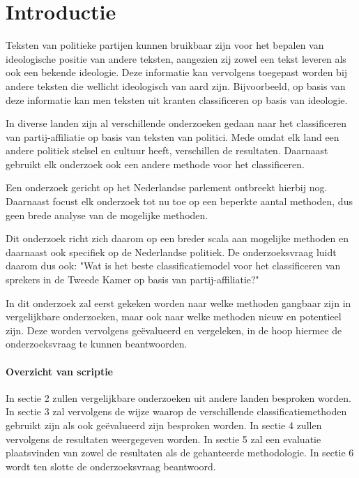 \section{Introductie}
\label{sec:intro}
Teksten van politieke partijen kunnen bruikbaar zijn voor het bepalen van ideologische positie van andere teksten, aangezien zij zowel een tekst leveren als ook een bekende ideologie. Deze informatie kan vervolgens toegepast worden bij andere teksten die wellicht ideologisch van aard zijn. Bijvoorbeeld, op basis van deze informatie kan men teksten uit kranten classificeren op basis van ideologie.\par
In diverse landen zijn al verschillende onderzoeken gedaan naar het classificeren van partij-affiliatie op basis van teksten van politici.\cite{Ferreira2016UsingTT} Mede omdat elk land een andere politiek stelsel en cultuur heeft, verschillen de resultaten. Daarnaast gebruikt elk onderzoek ook een andere methode voor het classificeren. \par
Een onderzoek gericht op het Nederlandse parlement ontbreekt hierbij nog. Daarnaast focust elk onderzoek tot nu toe op een beperkte aantal methoden, dus geen brede analyse van de mogelijke methoden. \par
Dit onderzoek richt zich daarom op een breder scala aan mogelijke methoden en daarnaast ook specifiek op de Nederlandse politiek. De onderzoeksvraag luidt daarom dus ook: "Wat is het beste classificatiemodel voor het classificeren van sprekers in de Tweede Kamer op basis van partij-affiliatie?"\par
In dit onderzoek zal eerst gekeken worden naar welke methoden gangbaar zijn in vergelijkbare onderzoeken, maar ook naar welke methoden nieuw en potentieel zijn. Deze worden vervolgens geëvalueerd en vergeleken, in de hoop hiermee de onderzoeksvraag te kunnen beantwoorden.


\paragraph{Overzicht van scriptie}
In sectie 2 zullen vergelijkbare onderzoeken uit andere landen besproken worden. In sectie 3 zal vervolgens de wijze waarop de verschillende classificatiemethoden gebruikt zijn als ook geëvalueerd zijn besproken worden. In sectie 4 zullen vervolgens de resultaten weergegeven worden. In sectie 5 zal een evaluatie plaatsvinden van zowel de resultaten als de gehanteerde methodologie. In sectie 6 wordt ten slotte de onderzoeksvraag beantwoord.
